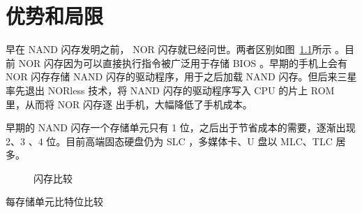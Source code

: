 \documentclass[../main]{subfiles}
\begin{document}
\chapter{优势和局限}%
\label{cha:comparision}

早在 NAND 闪存发明之前， NOR 闪存就已经问世。两者区别如图~\ref{fig:polar}所示
。目前 NOR 闪存因为可以直接执行指令被广泛用于存储 BIOS 。早期的手机上会有 NOR
闪存存储 NAND 闪存的驱动程序，用于之后加载 NAND 闪存。但后来三星率先退出
NORless 技术，将 NAND 闪存的驱动程序写入 CPU 的片上 ROM 里，从而将 NOR 闪存逐
出手机，大幅降低了手机成本。

早期的 NAND 闪存一个存储单元只有 1 位，之后出于节省成本的需要，逐渐出现 2、3
、4 位。目前高端固态硬盘仍为 SLC ，多媒体卡、U 盘以 MLC、TLC 居多。

\begin{figure}[htbp]
  \centering
{}
  \caption{闪存比较}%
  \label{fig:polar}
\end{figure}

\begin{table}[htbp]
  \centering
  \caption{每存储单元比特位比较}%
  \label{tab:bit}
\end{table}
\end{document}
